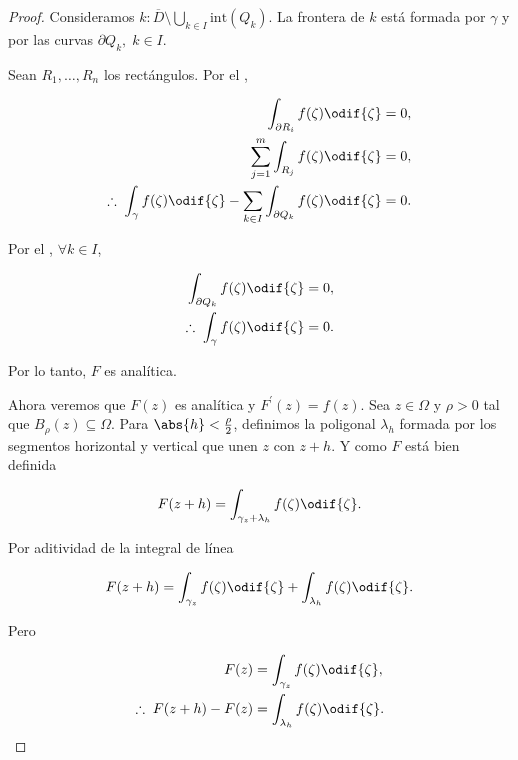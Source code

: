 \documentclass[../main.tex]{subfiles}
\begin{document}
\begin{proof}

    Consideramos \(k\colon \overline{D}\setminus \bigcup_{k\in
    I}\mathrm{int}(Q_{k})\). La
    frontera de \(k\) está formada por \(\gamma\) y por las curvas \(\partial
        Q_{k},\; k\in
    I\).

    Sean \(R_{1}, \dots, R_{n}\) los rectángulos. Por el ,

    \begin{align*}
        \int_{\partial R_{i}}^{}f(\zeta)\odif{\zeta} &= 0,\\
        \sum_{j = 1}^{m}\int_{R_{j}}^{}f(\zeta)\odif{\zeta} &= 0,\\
        \therefore\; \int_{\gamma}^{}f(\zeta)\odif{\zeta} - \sum_{k\in I}\int_{\partial
        Q_{k}}^{}f(\zeta)\odif{\zeta} &= 0.
    \end{align*}

    Por el , \(\forall
    k\in I\),

    \begin{align*}
        \int_{\partial Q_{k}}^{}f(\zeta)\odif{\zeta} &= 0,\\
        \therefore\; \int_{\gamma}^{}f(\zeta)\odif{\zeta} &= 0.
    \end{align*}

    Por lo tanto, \(F\) es analítica.

    Ahora veremos que \(F(z)\) es analítica y \(F^{\prime}(z) = f(z)\). Sea
    \(z\in \Omega\)
    y \(\rho > 0\) tal que \(B_{\rho}(z) \subseteq \Omega\). Para \(\abs{h} <
    \tfrac{\rho}{2}\), definimos la poligonal \(\lambda_{h}\) formada por los segmentos
    horizontal y vertical que unen \(z\) con \(z + h\). Y como \(F\) está bien definida

    \begin{equation*}
        F(z + h) = \int_{\gamma_{z} + \lambda_{h}}^{}f(\zeta)\odif{\zeta}.
    \end{equation*}

    Por aditividad de la integral de línea

    \begin{equation*}
        F(z + h) = \int_{\gamma_{z}}^{}f(\zeta)\odif{\zeta} +
        \int_{\lambda_{h}}^{}f(\zeta)\odif{\zeta}.
    \end{equation*}

    Pero

    \begin{align*}
        F(z) &= \int_{\gamma_{z}}^{}f(\zeta)\odif{\zeta},\\
        \therefore\; F(z + h) - F(z) &= \int_{\lambda_{h}}^{}f(\zeta)\odif{\zeta}.
    \end{align*}


\end{proof}
\end{document}

